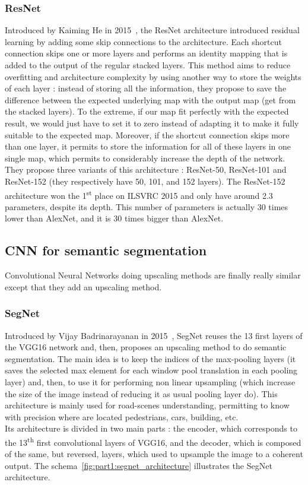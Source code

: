 \subsubsection{ResNet} Introduced by Kaiming He in 2015~\cite{HE16}, the ResNet architecture introduced residual learning by adding some skip connections to the architecture. Each shortcut connection skips one or more layers and performs an identity mapping that is added to the output of the regular stacked layers. This method aims to reduce overfitting and architecture complexity by using another way to store the weights of each layer : instead of storing all the information, they propose to save the difference between the expected underlying map with the output map (get from the stacked layers). To the extreme, if our map fit perfectly with the expected result, we would just have to set it to zero instead of adapting it to make it fully suitable to the expected map. Moreover, if the shortcut connection skips more than one layer, it permits to store the information for all of these layers in one single map, which permits to considerably increase the depth of the network. They propose three variants of this architecture : ResNet-50, ResNet-101 and ResNet-152 (they respectively have 50, 101, and 152 layers). The ResNet-152 architecture won the 1\textsuperscript{st} place on ILSVRC 2015 and only have around 2.3 parameters, despite its depth. This number of parameters is actually 30 times lower than AlexNet, and it is 30 times bigger than AlexNet.


\subsection{CNN for semantic segmentation} \label{1:comparison:segmentation}
Convolutional Neural Networks doing upscaling methods are finally really similar except that they add an upscaling method.
\subsubsection{SegNet} Introduced by Vijay Badrinarayanan in 2015~\cite{BADR15}, SegNet reuses the 13 first layers of the VGG16 network and, then, proposes an upscaling method to do semantic segmentation. The main idea is to keep the indices of the max-pooling layers (it saves the selected max element for each window pool translation in each pooling layer) and, then, to use it for performing non linear upsampling (which increase the size of the image instead of reducing it as usual pooling layer do). This architecture is mainly used for road-scenes understanding, permitting to know with precision where are located pedestrians, cars, building, etc. \\
Its architecture is divided in two main parts : the encoder, which corresponds to the 13\textsuperscript{th} first convolutional layers of VGG16, and the decoder, which is composed of the same, but reversed, layers, which used to upsample the image to a coherent output. The schema~\ref{fig:part1:segnet_architecture} illustrates the SegNet architecture.

